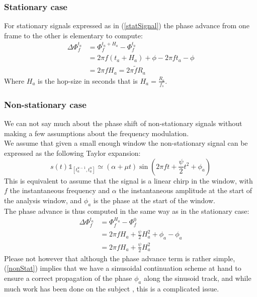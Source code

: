 \documentclass[]{article}
\begin{document}
\subsubsection{Stationary case}
For stationary signals expressed as in (\ref{statSignal}) the phase advance from one frame to the other is elementary to compute:
\begin{equation}\label{phaseAdvanceStat}
\begin{split}
\Delta \Phi_{f}^{t_a} & = \Phi_{f}^{t_a + H_a} - \Phi_{f}^{t_a}\\
& = 2\pi f (t_a + H_a) + \phi - 2\pi f t_a - \phi\\
& = 2\pi f H_a = 2\pi \tilde{f} R_a
\end{split}
\end{equation}
Where $H_a$ is the hop-size in seconds that is $H_a = \frac{R_a}{f_s}$.
\subsubsection{Non-stationary case}\label{theoretical_phase_advance_nonstat}
We can not say much about the phase shift of non-stationary signals without making a few assumptions about the frequency modulation.\\
We assume that given a small enough window the non-stationary signal can be expressed as the following Taylor expansion:
\begin{equation}\label{nonStat}
s(t) \mathds{1}_{[t_a^{u-1}, t_a^u]} \simeq (\alpha + \mu t) \sin(2\pi f t + \frac{\psi}{2} t^2 + \phi_a)
\end{equation}
This is equivalent to assume that the signal is a linear chirp in the window, with $f$ the instantaneous frequency and $\alpha$ the instantaneous amplitude at the start of the analysis window, and $\phi_a$ is the phase at the start of the window.\\
The phase advance is thus computed in the same way as in the stationary case:
\begin{equation}\label{phaseadvanceNonStat}
\begin{split}
\Delta \Phi_{f}^{t_a} & = \Phi_{f}^{H_a} - \Phi_{f}^{0}\\
& = 2\pi f H_a + \frac{\psi}{2} H_a^2 + \phi_a - \phi_a\\
& = 2\pi f H_a + \frac{\psi}{2}H_a^2
\end{split}
\end{equation}
Please not however that although the phase advance term is rather simple, (\ref{nonStat}) implies that we have a sinusoidal continuation scheme at hand to ensure a correct propagation of the phase $\phi_a$ along the sinusoid track, and while much work has been done on the subject \cite{amatriain2002spectral,karrer2006phavorit}, this is a complicated issue.

\newpage


\end{document}
